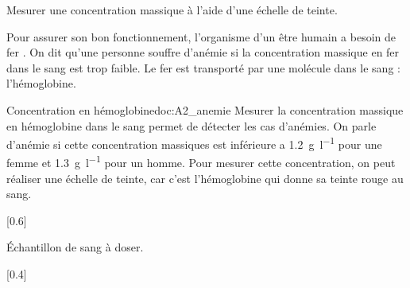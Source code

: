 \teteSndSolu

\vspace*{-36pt}

\begin{objectifs}
  \item Mesurer une concentration massique à l'aide d'une échelle de teinte.
\end{objectifs}


\begin{contexte}
  Pour assurer son bon fonctionnement, l'organisme d'un être humain a besoin de fer .
  On dit qu'une personne souffre d'anémie si la concentration massique en fer dans le sang est trop faible.
  Le fer est transporté par une molécule dans le sang : l'hémoglobine.

\end{contexte}


\begin{doc}{Concentration en hémoglobine}{doc:A2_anemie}
  Mesurer la concentration massique en hémoglobine dans le sang permet de détecter les cas d'anémies.
  On parle d'anémie si cette concentration massiques est inférieure a
  \qty{1,2}{\g\per\litre} pour une femme et \qty{1,3}{\g\per\litre} pour un homme.
  Pour mesurer cette concentration, on peut réaliser une échelle de teinte, car c'est l'hémoglobine qui donne sa teinte rouge au sang.

  [0.6]{
    \begin{center}
  
      Échantillon de sang à doser.
    \end{center}
  }[0.4]
\end{doc}

